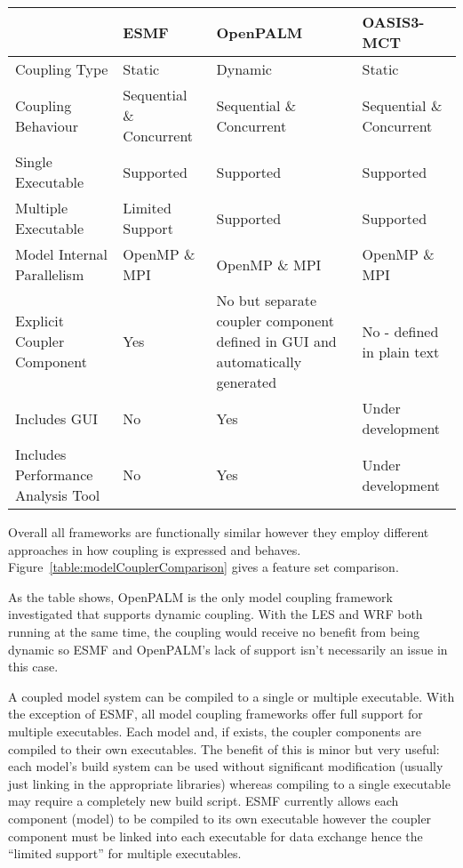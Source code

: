 \begin{figure*}
    \begin{tabular}{|l|l|p{4cm}|l|}
        \hline
        & ESMF & OpenPALM & OASIS3-MCT\\
        \hline
        Coupling Type & Static & Dynamic & Static\\
        \hline
        Coupling Behaviour & Sequential \& Concurrent & Sequential \&
        Concurrent & Sequential \& Concurrent\\
        \hline
        Single Executable & Supported & Supported & Supported\\
        \hline
        Multiple Executable & Limited Support & Supported & Supported\\
        \hline
        Model Internal Parallelism & OpenMP \& MPI & OpenMP \& MPI & OpenMP
        \& MPI\\
        \hline
        Explicit Coupler Component & Yes & No but separate coupler component
        defined in GUI and automatically generated & No - defined
        in plain text\\
        \hline
        Includes GUI & No & Yes & Under development\\
        \hline
        Includes Performance Analysis Tool & No & Yes & Under development\\
        \hline
    \end{tabular}
    \caption{Comparison of model coupling framework support}
    \label{table:modelCouplerComparison}
\end{figure*}

Overall all frameworks are functionally similar however they employ different
approaches in how coupling is expressed and behaves.
Figure~\ref{table:modelCouplerComparison} gives a feature set comparison.

As the table shows, OpenPALM is the only model coupling framework investigated
that supports dynamic coupling. With the LES and WRF both running at the same
time, the coupling would receive no benefit from being dynamic so ESMF and
OpenPALM's lack of support isn't necessarily an issue in this case.

A coupled model system can be compiled to a single or multiple executable. With
the exception of ESMF, all model coupling frameworks offer full support for
multiple executables. Each model and, if exists, the coupler components are
compiled to their own executables. The benefit of this is minor but very useful:
each model's build system can be used without significant modification (usually
just linking in the appropriate libraries) whereas compiling to a single
executable may require a completely new build script. ESMF currently allows each
component (model) to be compiled to its own executable however the coupler
component must be linked into each executable for data exchange hence the
``limited support'' for multiple executables.

